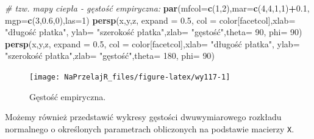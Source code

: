 \documentclass[polish,]{book}
\newenvironment{Shaded}{\begin{snugshade}}{\end{snugshade}}
\newcommand{\CommentTok}[1]{\textcolor[rgb]{0.56,0.35,0.01}{\textit{#1}}}
\newcommand{\DataTypeTok}[1]{\textcolor[rgb]{0.13,0.29,0.53}{#1}}
\newcommand{\DecValTok}[1]{\textcolor[rgb]{0.00,0.00,0.81}{#1}}
\newcommand{\FloatTok}[1]{\textcolor[rgb]{0.00,0.00,0.81}{#1}}
\newcommand{\KeywordTok}[1]{\textcolor[rgb]{0.13,0.29,0.53}{\textbf{#1}}}
\newcommand{\NormalTok}[1]{#1}
\newcommand{\OperatorTok}[1]{\textcolor[rgb]{0.81,0.36,0.00}{\textbf{#1}}}
\newcommand{\StringTok}[1]{\textcolor[rgb]{0.31,0.60,0.02}{#1}}
\begin{document}
\begin{Shaded}
\begin{Highlighting}[]
\CommentTok{# tzw. mapy ciepła - gęstość empiryczna:}
\KeywordTok{par}\NormalTok{(}\DataTypeTok{mfcol=}\KeywordTok{c}\NormalTok{(}\DecValTok{1}\NormalTok{,}\DecValTok{2}\NormalTok{),}\DataTypeTok{mar=}\KeywordTok{c}\NormalTok{(}\DecValTok{4}\NormalTok{,}\DecValTok{4}\NormalTok{,}\DecValTok{1}\NormalTok{,}\DecValTok{1}\NormalTok{)}\OperatorTok{+}\FloatTok{0.1}\NormalTok{,}
    \DataTypeTok{mgp=}\KeywordTok{c}\NormalTok{(}\DecValTok{3}\NormalTok{,}\FloatTok{0.6}\NormalTok{,}\DecValTok{0}\NormalTok{),}\DataTypeTok{las=}\DecValTok{1}\NormalTok{)}
\KeywordTok{persp}\NormalTok{(x,y,z, }\DataTypeTok{expand =} \FloatTok{0.5}\NormalTok{, }\DataTypeTok{col =}\NormalTok{ color[facetcol],}\DataTypeTok{xlab=} \StringTok{"długość płatka"}\NormalTok{,}
      \DataTypeTok{ylab=} \StringTok{"szerokość płatka"}\NormalTok{,}\DataTypeTok{zlab=} \StringTok{"gęstość"}\NormalTok{,}\DataTypeTok{theta=} \DecValTok{90}\NormalTok{, }\DataTypeTok{phi=} \DecValTok{90}\NormalTok{)}
\KeywordTok{persp}\NormalTok{(x,y,z, }\DataTypeTok{expand =} \FloatTok{0.5}\NormalTok{, }\DataTypeTok{col =}\NormalTok{ color[facetcol],}\DataTypeTok{xlab=} \StringTok{"długość płatka"}\NormalTok{,}
      \DataTypeTok{ylab=} \StringTok{"szerokość płatka"}\NormalTok{,}\DataTypeTok{zlab=} \StringTok{"gęstość"}\NormalTok{,}\DataTypeTok{theta=} \DecValTok{180}\NormalTok{, }\DataTypeTok{phi=} \DecValTok{90}\NormalTok{)}
\end{Highlighting}
\end{Shaded}

\begin{figure}[h]

{\centering \texttt{[image: NaPrzelajR\_files/figure-latex/wy117-1]} 

}

\caption{Gęstość empiryczna.}\label{fig:wy117}
\end{figure}

Możemy również przedstawić wykresy gęstości dwuwymiarowego rozkładu normalnego o określonych parametrach obliczonych na podstawie macierzy \texttt{X}.
\end{document}

